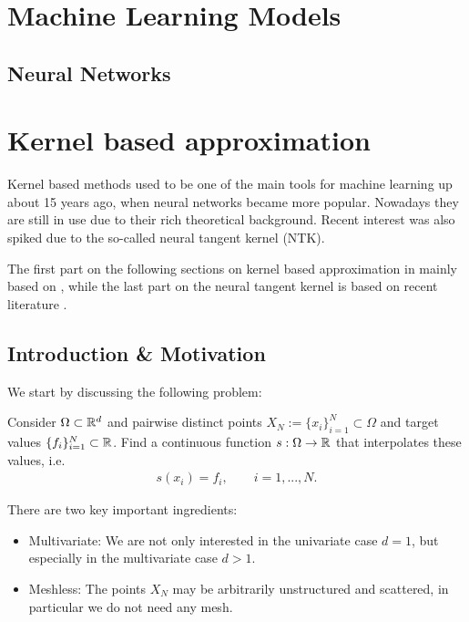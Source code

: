 \chapter{Machine Learning Models} %

\label{Chapter3} %
\setcounter{chapter}{3}

\section{Neural Networks}





\chapter{Kernel based approximation}


Kernel based methods used to be one of the main tools for machine learning up about 15 years ago, 
when neural networks became more popular.
Nowadays they are still in use due to their rich theoretical background. 
Recent interest was also spiked due to the so-called neural tangent kernel (NTK).

The first part on the following sections on kernel based approximation in mainly based on \cite{wendland2005scattered},
while the last part on the neural tangent kernel is based on recent literature \cite{jacot2018neural}.


\section{Introduction \& Motivation}

We start by discussing the following problem:

\begin{problem}
\label{prob:interpolation_problem}
Consider $\Omega \subset \mathbb{R}^d$ and pairwise distinct points $X_N := \{ x_i \}_{i=1}^N \subset \Omega$ and target values $\{ f_i \}_{i=1}^N \subset \mathbb{R}$.
Find a continuous function $s: \Omega \rightarrow \mathbb{R}$ that interpolates these values, i.e.\
\begin{align}
\label{eq:interpol_conditions}
s(x_i) = f_i, \qquad i=1, ..., N.
\end{align}
\end{problem}

There are two key important ingredients:
\begin{itemize}
\item Multivariate: We are not only interested in the univariate case $d=1$, but especially in the multivariate case $d>1$.
\item Meshless: The points $X_N$ may be arbitrarily unstructured and scattered, in particular we do not need any mesh.
\end{itemize}


